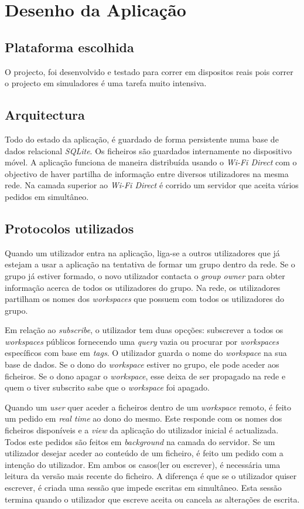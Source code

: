 \section{Desenho da Aplicação}

\subsection{Plataforma escolhida}
O projecto, foi desenvolvido e testado para correr em dispositos reais pois correr o projecto em simuladores é uma tarefa muito intensiva.
\subsection{Arquitectura}
Todo do estado da aplicação, é guardado de forma persistente numa base de dados relacional \textit{SQLite}. Os ficheiros são guardados internamente no dispositivo móvel. A aplicação funciona de maneira distribuída usando o \textit{Wi-Fi Direct} com o objectivo de haver partilha de informação entre diversos utilizadores na mesma rede. Na camada superior ao \textit{Wi-Fi Direct} é corrido um servidor que aceita vários pedidos em simultâneo.
\subsection{Protocolos utilizados}
Quando um utilizador entra na aplicação, liga-se a outros utilizadores que já estejam a usar a aplicação na tentativa de formar um grupo dentro da rede. Se o grupo já estiver formado, o novo utilizador contacta o \textit{group owner} para obter informação acerca de todos os utilizadores do grupo. Na rede, os utilizadores partilham os nomes dos \textit{workspaces} que possuem com todos os utilizadores do grupo.

Em relação ao \textit{subscribe}, o utilizador tem duas opcções: subscrever a todos os \textit{workspaces} públicos fornecendo uma \textit{query} vazia ou procurar por \textit{workspaces} específicos com base em \textit{tags}. O utilizador guarda o nome do \textit{workspace} na sua base de dados. Se o dono do \textit{workspace} estiver no grupo, ele pode aceder aos ficheiros. Se o dono apagar o \textit{workspace}, esse deixa de ser propagado na rede e quem o tiver subscrito sabe que o \textit{workspace} foi apagado.

Quando um \textit{user} quer aceder a ficheiros dentro de um \textit{workspace} remoto, é feito um pedido em \textit{real time} ao dono do mesmo. Este responde com os nomes dos ficheiros disponíveis e a \textit{view} da aplicação do utilizador inicial é actualizada. Todos este pedidos são feitos em \textit{background} na camada do servidor. Se um utilizador desejar aceder ao conteúdo de um ficheiro, é feito um pedido com a intenção do utilizador. Em ambos os casos(ler ou escrever), é necessária uma leitura da versão mais recente do ficheiro. A diferença é que se o utilizador quiser escrever, é criada uma sessão que impede escritas em simultâneo. Esta sessão termina quando o utilizador que escreve aceita ou cancela as alterações de escrita.

